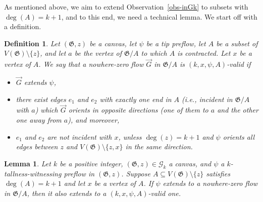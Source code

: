 \documentclass{article}
\newcommand{\GG}{\mathcal{G}}
\newcommand\g{\mathfrak{G}}
\newtheorem{lemma}[theorem]{Lemma}
\newtheorem{definition}[theorem]{Definition}
\begin{document}
As mentioned above, we aim to extend Observation~\ref{obs-inGk} to subsets with $\deg(A)=k+1$, and to this end, we need a technical lemma. We start off with a definition.
\begin{definition}
\label{def:validflow} 
Let $(\g,z)$ be a canvas, let $\psi$ be a tip preflow, let $A$ be a subset of $V(\g)\setminus \{z\}$, and let $a$ be the vertex of $\g/A$
to which $A$ is contracted.  Let $x$ be a vertex of $A$.  We say that a nowhere-zero flow $\vec{G}$ in $\g/A$ is \emph{$(k,x,\psi,A)$-valid}
if
\begin{itemize}
\item $\vec{G}$ extends $\psi$,
\item there exist edges $e_1$ and $e_2$ with exactly one end in $A$ (i.e., incident in $\g/A$ with $a$) which $\vec{G}$ orients
in opposite directions (one of them to $a$ and the other one away from $a$), and moreover,
\item $e_1$ and $e_2$ are not incident with $x$, unless $\deg(z)=k+1$ and $\psi$ orients all
edges between $z$ and $V(\g)\setminus\{z,x\}$ in the same direction.
\end{itemize}
\end{definition}
\begin{lemma}\label{lemma-extori}
Let $k$ be a positive integer, $(\g,z)\in \GG_k$ a canvas, and $\psi$ a $k$-tallness-witnessing preflow in $(\g,z)$.
Suppose $A\subseteq V(\g)\setminus \{z\}$ satisfies $\deg(A)=k+1$ and let $x$ be a vertex of $A$.  If $\psi$ extends to a nowhere-zero flow in $\g/A$, then it also extends to a $(k, x,\psi,A)$-valid one.
\end{lemma}
\end{document}
